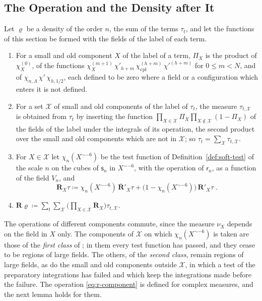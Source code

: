 \documentclass[11pt]{preprint}
\numberwithin{equation}{section}
\begin{document}
\subsection{The Operation and the Density after It}\label{sec:r-density}

\begin{definition}\label{def:r-operation}
Let $\varrho$ be a density of the order $n$, the sum of the terms $\tau_t$, and let the functions of this section be formed with the fields of the label of each term.
\begin{enumerate}[label=(\roman*)]
\item For a small and old component $X$ of the label of a term, $\Pi_X$ is the product of $\chi^{(0)}_X$, of the functions $\chi^{(m+1)}_X\,\chi'_{h+m}\,\chi^{(h+m)}_{\mathrm{cpl}}\,\chi'^{(h+m)}$ for $0 \leqslant m < N$, and of $\chi_{n,\Lambda}\,\chi'\,\chi_{h,1/2}$, each defined to be zero where a field or a configuration which enters it is not defined.
\item For a set $\mathcal X$ of small and old components of the label of $\tau_t$, the measure $\tau_{t,\mathcal X}$ is obtained from $\tau_t$ by inserting the function $\prod_{X \in \mathcal X}\Pi_X\prod_{X \notin \mathcal X}(1 - \Pi_X)$ of the fields of the label under the integrals of its operation, the second product over the small and old components which are not in $\mathcal X$; so $\tau_t = \sum_{\mathcal X}\tau_{t,\mathcal X}$.
\item For $X \in \mathcal X$ let $\chi_n(X^{\sim-6})$ be the test function of Definition~\ref{def:soft-test} of the scale $n$ on the cubes of $\mathsf s_n$ in $X^{\sim-6}$, with the operation of $\mathsf r_n$, as a function of the field $V_n$, and
\begin{equation}\label{eq:r-component}
    \mathbf R_X\tau \coloneqq \chi_n(X^{\sim-6})\,\bar{\mathbf R}'_X\tau + \bigl(1 - \chi_n(X^{\sim-6})\bigr)\,\mathbf R'_X\tau\;.
\end{equation}
\item $\mathbf R\varrho \coloneqq \sum_t\sum_{\mathcal X}\bigl(\prod_{X \in \mathcal X}\mathbf R_X\bigr)\tau_{t,\mathcal X}$.
\end{enumerate}
\end{definition}

The operations of different components commute, since the measure $\nu_X$ depends on the field in $X$ only. The components of $\mathcal X$ on which $\chi_n(X^{\sim-6})$ is taken are those of the \emph{first class} of \cite[p.~378]{BalabanLFR2}; in them every test function has passed, and they cease to be regions of large fields. The others, of the \emph{second class}, remain regions of large fields, as do the small and old components outside $\mathcal X$, in which a test of the preparatory integrations has failed and which keep the integrations made before the failure. The operation \eqref{eq:r-component} is defined for complex measures, and the next lemma holds for them.
\end{document}
